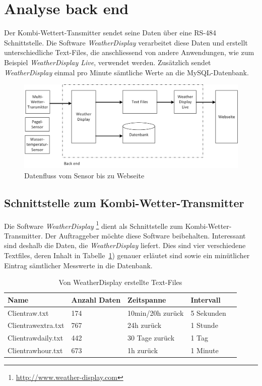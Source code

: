 \section{Analyse back end}
Der Kombi-Wettert-Tansmitter sendet seine Daten über eine RS-484 Schnittstelle. Die Software \textit{WeatherDisplay} verarbeitet diese Daten und erstellt unterschiedliche Text-Files, die anschliessend von andere Anwendungen, wie zum Beispiel \textit{WeatherDisplay Live}, verwendet werden. Zusätzlich sendet \textit{WeatherDisplay} einmal pro Minute sämtliche Werte an die MySQL-Datenbank.

\begin{figure}[h!]
	\centering
	\includegraphics[width=1\linewidth]{img/datenfluss}
	\caption{Datenfluss vom Sensor bis zu Webseite}
	\label{img:datenfluss}
\end{figure}



\subsection{Schnittstelle zum Kombi-Wetter-Transmitter}
Die Software \textit{WeatherDisplay} \footnote{ \url{http://www.weather-display.com}} dient als Schnittstelle zum Kombi-Wetter-Transmitter. Der Auftraggeber möchte diese Software beibehalten. Interessant sind deshalb die Daten, die  \textit{WeatherDisplay} liefert. Dies sind vier verschiedene Textfiles, deren Inhalt in Tabelle~\ref{table:text-files}) genauer erläutet sind sowie ein minütlicher Eintrag sämtlicher Messwerte in die Datenbank.
\newline

\begin{table}[h!]
\centering
\begin{tabular}{|l|l|l|l|l|}
\hline
 Name			&  Anzahl Daten	& 	Zeitspanne  		& 	Intervall			\\ \hline
 Clientraw.txt 		&  174			&  	10min/20h zurück 	& 	5 Sekunden 		\\ \hline
 Clientrawextra.txt	&  767 			&  	24h zurück 		& 	1 Stunde 			\\ \hline
 Clientrawdaily.txt 	&  442 			&  	30 Tage zurück 	&  	1 Tag 			\\ \hline
 Clientrawhour.txt	&  673			&  	1h zurück 			& 	1 Minute 			\\ \hline
\end{tabular}
\caption{Von WeatherDisplay erstellte Text-Files}
\label{table:text-files}
\end{table}

